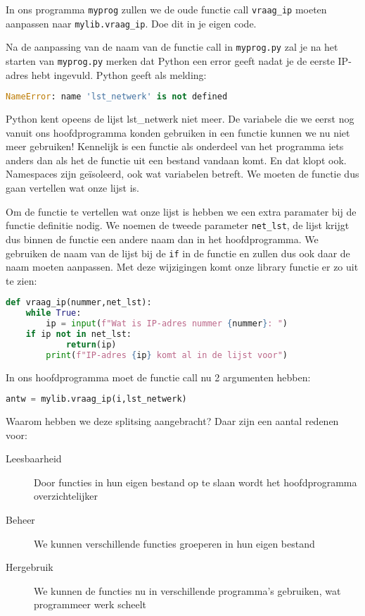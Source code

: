 In ons programma \texttt{myprog} zullen we de oude functie call \texttt{vraag\_ip} moeten aanpassen naar \texttt{mylib.vraag\_ip}. Doe dit in je eigen code.

Na de aanpassing van de naam van de functie call in \texttt{myprog.py} zal je na het starten van \texttt{myprog.py} merken dat Python een error geeft nadat je de eerste IP-adres hebt ingevuld. Python geeft als melding:
\begin{lstlisting}[language=python]
NameError: name 'lst_netwerk' is not defined
\end{lstlisting}
Python kent opeens de lijst lst\_netwerk niet meer. De variabele die we eerst nog vanuit ons hoofdprogramma konden gebruiken in een functie kunnen we nu niet meer gebruiken! Kennelijk is een functie als onderdeel van het programma iets anders dan als het de functie uit een bestand vandaan komt. En dat klopt ook. Namespaces zijn ge\"isoleerd, ook wat variabelen betreft. We moeten de functie dus gaan vertellen wat onze lijst is.

Om de functie te vertellen wat onze lijst is hebben we een extra paramater bij de functie definitie nodig. We noemen de tweede parameter \texttt{net\_lst}, de lijst krijgt dus binnen de functie een andere naam dan in het hoofdprogramma. We gebruiken de naam van de lijst bij de \texttt{if} in de functie en zullen dus ook daar de naam moeten aanpassen. Met deze wijzigingen komt onze library functie er zo uit te zien:
\begin{lstlisting}[language=python]
def vraag_ip(nummer,net_lst):
    while True:
        ip = input(f"Wat is IP-adres nummer {nummer}: ")
	if ip not in net_lst:
            return(ip)
        print(f"IP-adres {ip} komt al in de lijst voor")
\end{lstlisting}

In ons hoofdprogramma moet de functie call nu 2 argumenten hebben:
\begin{lstlisting}[language=python]
    antw = mylib.vraag_ip(i,lst_netwerk)
\end{lstlisting}

Waarom hebben we deze splitsing aangebracht? Daar zijn een aantal redenen voor:
\begin{description}
	\item[Leesbaarheid] Door functies in hun eigen bestand op te slaan wordt het hoofdprogramma overzichtelijker
	\item[Beheer] We kunnen verschillende functies groeperen in hun eigen bestand
	\item[Hergebruik] We kunnen de functies nu in verschillende programma's gebruiken, wat programmeer werk scheelt
\end{description}

